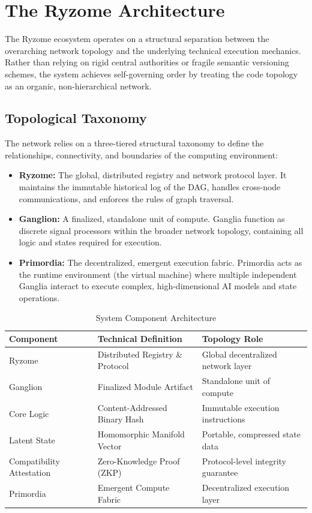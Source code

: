 \documentclass{article}
\begin{document}
\section{The Ryzome Architecture}
The Ryzome ecosystem operates on a structural separation between the overarching network topology and the underlying technical execution mechanics. Rather than relying on rigid central authorities or fragile semantic versioning schemes, the system achieves self-governing order by treating the code topology as an organic, non-hierarchical network.

\subsection{Topological Taxonomy}
The network relies on a three-tiered structural taxonomy to define the relationships, connectivity, and boundaries of the computing environment:
\begin{itemize}
    \item \textbf{Ryzome:} The global, distributed registry and network protocol layer. It maintains the immutable historical log of the DAG, handles cross-node communications, and enforces the rules of graph traversal.
    \item \textbf{Ganglion:} A finalized, standalone unit of compute. Ganglia function as discrete signal processors within the broader network topology, containing all logic and states required for execution.
    \item \textbf{Primordia:} The decentralized, emergent execution fabric. Primordia acts as the runtime environment (the virtual machine) where multiple independent Ganglia interact to execute complex, high-dimensional AI models and state operations.
\end{itemize}

\begin{table}[h]
\centering
\caption{System Component Architecture}
\label{tab:components}
\begin{tabular}{lll}
\toprule
\textbf{Component} & \textbf{Technical Definition} & \textbf{Topology Role} \\
\midrule
Ryzome & Distributed Registry \& Protocol & Global decentralized network layer \\
Ganglion & Finalized Module Artifact & Standalone unit of compute \\
Core Logic & Content-Addressed Binary Hash & Immutable execution instructions \\
Latent State & Homomorphic Manifold Vector & Portable, compressed state data \\
Compatibility Attestation & Zero-Knowledge Proof (ZKP) & Protocol-level integrity guarantee \\
Primordia & Emergent Compute Fabric & Decentralized execution layer \\
\bottomrule
\end{tabular}
\end{table}
\end{document}

